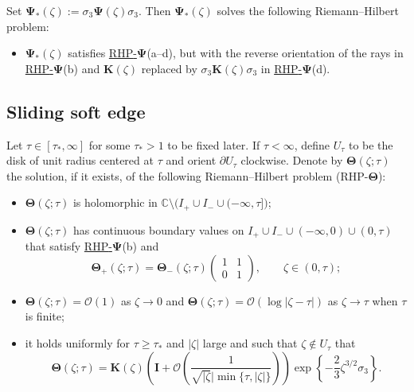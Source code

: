 \documentclass[pdftex]{sigma}
\numberwithin{equation}{section}
\newcommand{\C}		{\mathbb{C}}
\newcommand{\rhpsi} {\textnormal{RHP}-${\boldsymbol \Psi}$}
\newcommand{\rhth} {\textnormal{RHP}-${\boldsymbol \Theta}$}
\begin{document}
 Set $ \boldsymbol \Psi_*(\zeta) := \sigma_3\boldsymbol\Psi(\zeta)\sigma_3 $. Then $ \boldsymbol \Psi_*(\zeta) $ solves the following Riemann--Hilbert problem:
 \begin{itemize}\itemsep=0pt\setlength{\leftskip}{0.1cm}
\label{rhwpsi}
\item[(a--d)] $\boldsymbol\Psi_*(\zeta)$ satisfies \hyperref[rhpsi]{\rhpsi}(a--d), but with the reverse orientation of the rays in \hyperref[rhpsi]{\rhpsi}(b) and $ \boldsymbol K(\zeta) $ replaced by $ \sigma_3\boldsymbol K(\zeta)\sigma_3 $ in \hyperref[rhpsi]{\rhpsi}(d).
\end{itemize}


\subsection{Sliding soft edge}
\label{ss:sse}


Let $ \tau\in[\tau_*,\infty] $ for some $ \tau_*>1 $ to be fixed later. If $ \tau<\infty $, define $ U_\tau $ to be the disk of unit radius centered at $ \tau $ and orient $ \partial U_\tau $ clockwise. Denote by $\boldsymbol\Theta(\zeta;\tau)$ the solution, if it exists, of the following Riemann--Hilbert problem (\rhth):
\begin{itemize}\itemsep=0pt
\label{rhth}
\item[(a)] $\boldsymbol\Theta(\zeta;\tau)$ is holomorphic in $\C\setminus\bigl(I_+\cup I_-\cup(-\infty,\tau]\bigr)$;
\item[(b)] $\boldsymbol\Theta(\zeta;\tau)$ has continuous boundary values on $I_+\cup I_-\cup(-\infty,0)\cup(0,\tau)$ that satisfy \hyperref[rhpsi]{\rhpsi}(b) and
\[
\boldsymbol\Theta_+(\zeta;\tau) = \boldsymbol\Theta_-(\zeta;\tau) \left(\begin{matrix} 1 & 1 \\ 0 & 1 \end{matrix}\right), \qquad \zeta\in(0,\tau);
\]
\item[(c)] $ \boldsymbol\Theta(\zeta;\tau)=\boldsymbol{\mathcal O}(1) $ as $\zeta\to0$ and $ \boldsymbol\Theta(\zeta;\tau)=\boldsymbol{\mathcal O}(\log|\zeta-\tau|) $ as $\zeta\to\tau$ when $ \tau $ is finite;
\item[(d)] it holds uniformly for $ \tau\geq\tau_* $ and $ |\zeta| $ large and such that $ \zeta\not\in U_\tau $ that
\[
\boldsymbol\Theta(\zeta;\tau) = \boldsymbol K(\zeta)\left(\boldsymbol I+\boldsymbol{\mathcal O}\left(\frac1{\sqrt{|\zeta}|\min\{\tau,|\zeta|\}}\right)\right) \exp\left\{-\frac23\zeta^{3/2}\sigma_3\right\}.
\]
\end{itemize}
\end{document}
